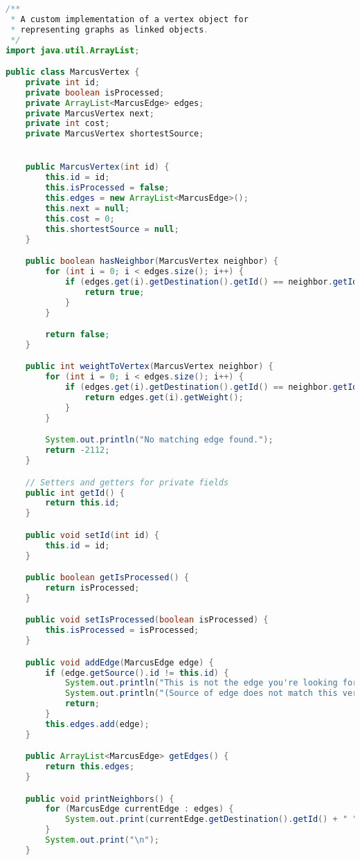 \documentclass[letterpaper, 10pt]{article}
\begin{document}
\begin{lstlisting}[language=Java, firstnumber=1]
/**
 * A custom implementation of a vertex object for
 * representing graphs as linked objects.
 */
import java.util.ArrayList;

public class MarcusVertex {
    private int id;
    private boolean isProcessed;
    private ArrayList<MarcusEdge> edges;
    private MarcusVertex next;
    private int cost;
    private MarcusVertex shortestSource;


    public MarcusVertex(int id) {
        this.id = id;
        this.isProcessed = false;
        this.edges = new ArrayList<MarcusEdge>();
        this.next = null;
        this.cost = 0;
        this.shortestSource = null;
    }

    public boolean hasNeighbor(MarcusVertex neighbor) {
        for (int i = 0; i < edges.size(); i++) {
            if (edges.get(i).getDestination().getId() == neighbor.getId()) {
                return true;
            }
        }

        return false;
    }

    public int weightToVertex(MarcusVertex neighbor) {
        for (int i = 0; i < edges.size(); i++) {
            if (edges.get(i).getDestination().getId() == neighbor.getId()) {
                return edges.get(i).getWeight();
            }
        }

        System.out.println("No matching edge found.");
        return -2112;
    }

    // Setters and getters for private fields
    public int getId() {
        return this.id;
    }

    public void setId(int id) {
        this.id = id;
    }

    public boolean getIsProcessed() {
        return isProcessed;
    }

    public void setIsProcessed(boolean isProcessed) {
        this.isProcessed = isProcessed;
    }

    public void addEdge(MarcusEdge edge) {
        if (edge.getSource().id != this.id) {
            System.out.println("This is not the edge you're looking for...");
            System.out.println("(Source of edge does not match this vertex)");
            return;
        }
        this.edges.add(edge);
    }

    public ArrayList<MarcusEdge> getEdges() {
        return this.edges;
    }

    public void printNeighbors() {
        for (MarcusEdge currentEdge : edges) {
            System.out.print(currentEdge.getDestination().getId() + " ");
        }
        System.out.print("\n");
    }


\end{lstlisting}
\end{document}
